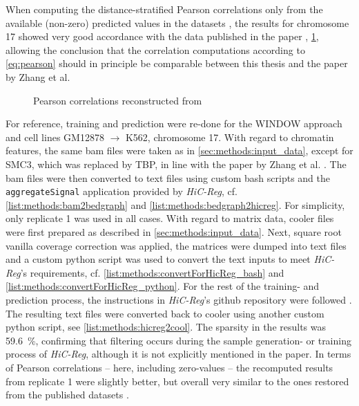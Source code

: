 When computing the distance-stratified Pearson correlations only from the available (non-zero) predicted values in the datasets \cite{ShiluZhang2019,ShiluZhang2019a},
the results for chromosome 17 showed very good accordance with the data published in the paper \cite[fig.\,10]{Zhang2019}, \cref{fig:methods:zhang_correlations_reconstructed},
allowing the conclusion that the correlation computations according to \cref{eq:pearson} should in principle be comparable between this thesis and the paper by Zhang et al.
\begin{figure}[htbp]
 \begin{subfigure}{0.45\textwidth}
 \end{subfigure}\hfill
 \begin{subfigure}{0.45\textwidth}
 \end{subfigure}
\caption{Pearson correlations reconstructed from \cite{Zhang2019,ShiluZhang2019,ShiluZhang2019a}} \label{fig:methods:zhang_correlations_reconstructed}
\end{figure}

For reference, training and prediction were re-done for the WINDOW approach and cell lines GM12878 $\rightarrow$ K562, chromosome 17.
With regard to chromatin features, the same bam files were taken as in \cref{sec:methods:input_data}, except for SMC3, which was replaced by TBP,
in line with the paper by Zhang et al. \cite{Zhang2019}. 
The bam files were then converted to text files using custom bash scripts and the \texttt{aggregateSignal} application provided by \emph{HiC-Reg}, 
cf. \cref{list:methods:bam2bedgraph} and \ref{list:methods:bedgraph2hicreg}. 
For simplicity, only replicate 1 was used in all cases.
With regard to matrix data, cooler files were first prepared as described in \cref{sec:methods:input_data}.
Next, square root vanilla coverage correction was applied, the matrices were dumped into text files and a custom python script was used
to convert the text inputs to meet \emph{HiC-Reg}'s requirements, cf. \cref{list:methods:convertForHicReg_bash} and \ref{list:methods:convertForHicReg_python}.
For the rest of the training- and prediction process, the instructions in \emph{HiC-Reg}'s github repository were followed \cite{Zhang2019}.
The resulting text files were converted back to cooler using another custom python script, see \cref{list:methods:hicreg2cool}.
The sparsity in the results was \SI{59.6}{\percent}, confirming that filtering occurs during the sample generation- or training process of \emph{HiC-Reg},
although it is not explicitly mentioned in the paper.
In terms of Pearson correlations -- here, including zero-values -- the recomputed results from replicate 1 were slightly better,
but overall very similar to the ones restored from the published datasets \cite{ShiluZhang2019,ShiluZhang2019a}. 

